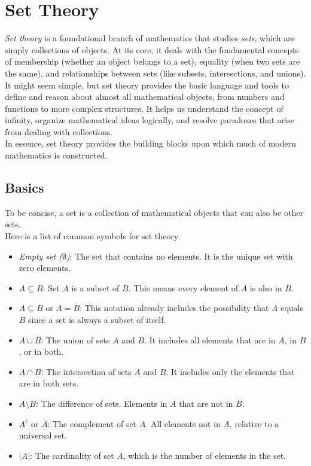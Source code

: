 \newpage
\section{Set Theory}

\emph{Set theory} is a foundational branch of mathematics that studies \emph{sets}, which are simply 
collections of objects. At its core, it deals with the fundamental concepts of membership 
(whether an object belongs to a set), equality (when two sets are the same), and relationships 
between sets (like subsets, intersections, and unions).\\
It might seem simple, but set theory provides the basic language and tools to define 
and reason about almost all mathematical objects, from numbers and functions to 
more complex structures. It helps us understand the concept of infinity, organize mathematical 
ideas logically, and resolve paradoxes that arise from dealing with collections.\\
In essence, set theory provides the building blocks upon which much of modern mathematics is constructed.

\subsection{Basics}
To be concise, a set is a collection of mathematical objects that can also be other sets.\\
Here is a list of common symbols for set theory.

\begin{itemize}

	\item \emph{Empty set (\(\emptyset\))}: The set that contains no elements. It is the unique set with 
	      zero elements.

	\item \(A \subseteq B\): Set \(A\) is a subset of \(B\). This means every element of \(A\) is also 
	      in \(B\).

	\item \(A \subseteq B\) or \(A = B\): This notation already includes the possibility that \(A\) equals 
		  \(B\) since a set is always a subset of itself.

	\item \(A \cup B\): The union of sets \(A\) and \(B\). It includes all elements that are in \(A\), in 
	      \(B\), or in both.

	\item \(A \cap B\): The intersection of sets \(A\) and \(B\). It includes only the elements that are in 
	      both sets.

	\item \(A \setminus B\): The difference of sets. Elements in \(A\) that are not in \(B\).

	\item \(A^c\) or \(\overline{A}\): The complement of set \(A\). All elements not in \(A\), relative to 
	      a universal set.

	\item \(|A|\): The cardinality of set \(A\), which is the number of elements in the set.

\end{itemize}
\smallskip

